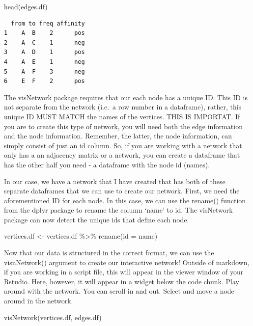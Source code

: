 \documentclass[
  letterpaper,
  DIV=11,
  numbers=noendperiod]{scrreprt}
\newenvironment{Shaded}{\begin{snugshade}}{\end{snugshade}}
\newcommand{\AttributeTok}[1]{\textcolor[rgb]{0.40,0.45,0.13}{#1}}
\newcommand{\FunctionTok}[1]{\textcolor[rgb]{0.28,0.35,0.67}{#1}}
\newcommand{\NormalTok}[1]{\textcolor[rgb]{0.00,0.23,0.31}{#1}}
\newcommand{\OtherTok}[1]{\textcolor[rgb]{0.00,0.23,0.31}{#1}}
\newcommand{\SpecialCharTok}[1]{\textcolor[rgb]{0.37,0.37,0.37}{#1}}
\begin{document}
\begin{Shaded}
\begin{Highlighting}[]
\FunctionTok{head}\NormalTok{(edges.df)}
\end{Highlighting}
\end{Shaded}

\begin{verbatim}
  from to freq affinity
1    A  B    2      pos
2    A  C    1      neg
3    A  D    1      pos
4    A  E    1      neg
5    A  F    3      neg
6    E  F    2      pos
\end{verbatim}

The visNetwork package requires that our each node has a unique ID. This
ID is not separate from the network (i.e.~a row number in a dataframe),
rather, this unique ID MUST MATCH the names of the vertices. THIS IS
IMPORTAT. If you are to create this type of network, you will need both
the edge information and the node information. Remember, the latter, the
node information, can simply consist of just an id column. So, if you
are working with a network that only has a an adjacency matrix or a
network, you can create a dataframe that has the other half you need - a
dataframe with the node id (names).

In our case, we have a network that I have created that has both of
these separate dataframes that we can use to create our network. First,
we need the aforementioned ID for each node. In this case, we can use
the rename() function from the dplyr package to rename the column `name'
to id. The visNetwork package can now detect the unique ids that define
each node.

\begin{Shaded}
\begin{Highlighting}[]
\NormalTok{vertices.df }\OtherTok{\textless{}{-}}\NormalTok{ vertices.df }\SpecialCharTok{\%\textgreater{}\%}
  \FunctionTok{rename}\NormalTok{(}\AttributeTok{id =}\NormalTok{ name)}
\end{Highlighting}
\end{Shaded}

Now that our data is structured in the correct format, we can use the
visnNetwork() argument to create our interactive network! Outside of
markdown, if you are working in a script file, this will appear in the
viewer window of your Rstudio. Here, however, it will appear in a widget
below the code chunk. Play around with the network. You can scroll in
and out. Select and move a node around in the network.

\begin{Shaded}
\begin{Highlighting}[]
\FunctionTok{visNetwork}\NormalTok{(vertices.df, edges.df)}
\end{Highlighting}
\end{Shaded}
\end{document}
